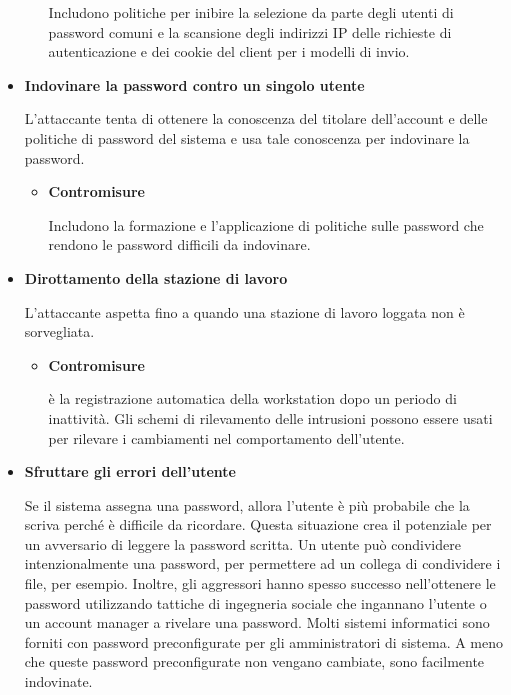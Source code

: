 \begin{itemize}
\begin{itemize}
        Includono politiche per inibire la selezione da parte degli utenti di password comuni e la scansione degli indirizzi IP delle richieste di autenticazione e dei cookie del client per i modelli di invio.
        
    \end{itemize}

\item\textbf{Indovinare la password contro un singolo utente}

L'attaccante tenta di ottenere la conoscenza del titolare dell'account e delle politiche di password del sistema e usa tale conoscenza per indovinare la password.

    \begin{itemize}
        \item \textbf{Contromisure}
        
        Includono la formazione e l'applicazione di politiche sulle password che rendono le password difficili da indovinare.
        
    \end{itemize} 

\item\textbf{Dirottamento della stazione di lavoro}

L'attaccante aspetta fino a quando una stazione di lavoro loggata non è sorvegliata.

\begin{itemize}
    \item\textbf{Contromisure}
    
    è la registrazione automatica della workstation dopo un periodo di inattività. Gli schemi di rilevamento delle intrusioni possono essere usati per rilevare i cambiamenti nel comportamento dell'utente.
    
\end{itemize}

\item \textbf{Sfruttare gli errori dell'utente}

Se il sistema assegna una password, allora l'utente è più probabile che la scriva perché è difficile da ricordare. Questa situazione crea il potenziale per un avversario di leggere la password scritta. Un utente può condividere intenzionalmente una password, per permettere ad un collega di condividere i file, per esempio. Inoltre, gli aggressori hanno spesso successo nell'ottenere le password utilizzando tattiche di ingegneria sociale che ingannano l'utente o un account manager a rivelare una password. Molti sistemi informatici sono forniti con password preconfigurate per gli amministratori di sistema. A meno che queste password preconfigurate non vengano cambiate, sono facilmente indovinate.


\end{itemize}
